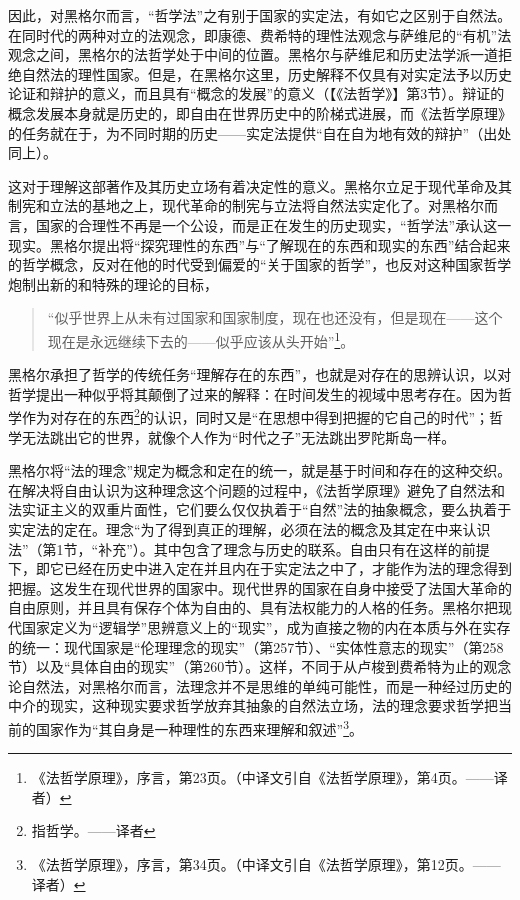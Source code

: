 因此，对黑格尔而言，“哲学法”之有别于国家的实定法，有如它之区别于自然法。在同时代的两种对立的法观念，即康德、费希特的理性法观念与萨维尼的“有机”法观念之间，黑格尔的法哲学处于中间的位置。黑格尔与萨维尼和历史法学派一道拒绝自然法的理性国家。但是，在黑格尔这里，历史解释不仅具有对实定法予以历史论证和辩护的意义，而且具有“概念的发展”的意义（【《法哲学》】第3节）。辩证的概念发展本身就是历史的，即自由在世界历史中的阶梯式进展，而《法哲学原理》的任务就在于，为不同时期的历史——实定法提供“自在自为地有效的辩护”（出处同上）。

这对于理解这部著作及其历史立场有着决定性的意义。黑格尔立足于现代革命及其制宪和立法的基地之上，现代革命的制宪与立法将自然法实定化了。对黑格尔而言，国家的合理性不再是一个公设，而是正在发生的历史现实，“哲学法”承认这一现实。黑格尔提出将“探究理性的东西”与“了解现在的东西和现实的东西”结合起来的哲学概念，反对在他的时代受到偏爱的“关于国家的哲学”，也反对这种国家哲学炮制出新的和特殊的理论的目标，

\begin{quote}
“似乎世界上从未有过国家和国家制度，现在也还没有，但是现在——这个现在是永远继续下去的——似乎应该从头开始”\footnote{《法哲学原理》，序言，第23页。（中译文引自《法哲学原理》，第4页。——译者）}。
\end{quote}

黑格尔承担了哲学的传统任务“理解存在的东西”，也就是对存在的思辨认识，以对哲学提出一种似乎将其颠倒了过来的解释：在时间发生的视域中思考存在。因为哲学作为对存在的东西\footnote{指哲学。——译者}的认识，同时又是“在思想中得到把握的它自己的时代”；哲学无法跳出它的世界，就像个人作为“时代之子”无法跳出罗陀斯岛一样。

黑格尔将“法的理念”规定为概念和定在的统一，就是基于时间和存在的这种交织。在解决将自由认识为这种理念这个问题的过程中，《法哲学原理》避免了自然法和法实证主义的双重片面性，它们要么仅仅执着于“自然”法的抽象概念，要么执着于实定法的定在。理念“为了得到真正的理解，必须在法的概念及其定在中来认识法”（第1节，“补充”）。其中包含了理念与历史的联系。自由只有在这样的前提下，即它已经在历史中进入定在并且内在于实定法之中了，才能作为法的理念得到把握。这发生在现代世界的国家中。现代世界的国家在自身中接受了法国大革命的自由原则，并且具有保存个体为自由的、具有法权能力的人格的任务。黑格尔把现代国家定义为“逻辑学”思辨意义上的“现实”，成为直接之物的内在本质与外在实存的统一：现代国家是“伦理理念的现实”（第257节）、“实体性意志的现实”（第258节）以及“具体自由的现实”（第260节）。这样，不同于从卢梭到费希特为止的观念论自然法，对黑格尔而言，法理念并不是思维的单纯可能性，而是一种经过历史的中介的现实，这种现实要求哲学放弃其抽象的自然法立场，法的理念要求哲学把当前的国家作为“其自身是一种理性的东西来理解和叙述”\footnote{《法哲学原理》，序言，第34页。（中译文引自《法哲学原理》，第12页。——译者）}。

